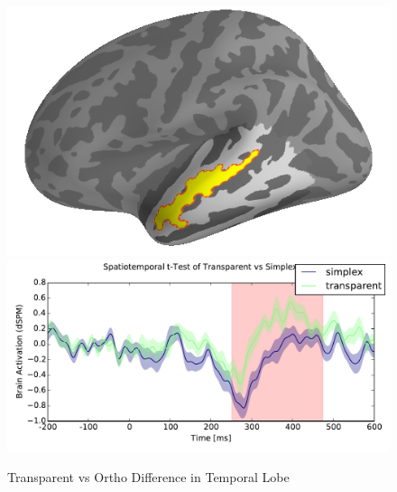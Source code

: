 \documentclass{frontiersSCNS}
\begin{document}
\begin{figure}
\begin{centering}
\includegraphics[scale=0.33]{images/transparent_prime_brain_analysis}\includegraphics[scale=0.33]{images/transparent_prime_analysis}
\par\end{centering}
\caption{\label{fig:transparent_primes} Transparent vs Ortho Difference in Temporal Lobe}
\end{figure}
\end{document}
